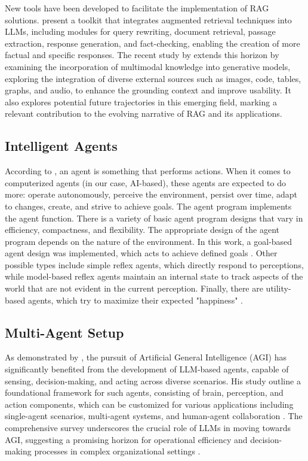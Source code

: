             New tools have been developed to facilitate the implementation of RAG solutions. \citet{Liu2023} present a toolkit that integrates augmented retrieval techniques into LLMs, including modules for query rewriting, document retrieval, passage extraction, response generation, and fact-checking, enabling the creation of more factual and specific responses. The recent study by \citet{Zhao2023} extends this horizon by examining the incorporation of multimodal knowledge into generative models, exploring the integration of diverse external sources such as images, code, tables, graphs, and audio, to enhance the grounding context and improve usability. It also explores potential future trajectories in this emerging field, marking a relevant contribution to the evolving narrative of RAG and its applications.

        \subsection{Intelligent Agents} 

            According to \citet{Russell2020}, an agent is something that performs actions. When it comes to computerized agents (in our case, AI-based), these agents are expected to do more: operate autonomously, perceive the environment, persist over time, adapt to changes, create, and strive to achieve goals.
            The agent program implements the agent function.
            There is a variety of basic agent program designs that vary in efficiency, compactness, and flexibility. The appropriate design of the agent program depends on the nature of the environment. In this work, a goal-based agent design was implemented, which acts to achieve defined goals \citep{Russell2020}.
            Other possible types include simple reflex agents, which directly respond to perceptions, while model-based reflex agents maintain an internal state to track aspects of the world that are not evident in the current perception. Finally, there are utility-based agents, which try to maximize their expected "happiness" \citep{Russell2020}.
            
        \subsection{Multi-Agent Setup} 
        
            As demonstrated by \citet{xi2023rise}, the pursuit of Artificial General Intelligence (AGI) has significantly benefited from the development of LLM-based agents, capable of sensing, decision-making, and acting across diverse scenarios.        
            His study outline a foundational framework for such agents, consisting of brain, perception, and action components, which can be customized for various applications including single-agent scenarios, multi-agent systems, and human-agent collaboration . 
            The comprehensive survey underscores the crucial role of LLMs in moving towards AGI, suggesting a promising horizon for operational efficiency and decision-making processes in complex organizational settings \citep{xi2023rise}.

